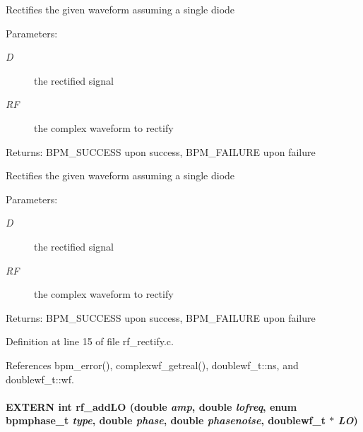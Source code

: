 Rectifies the given waveform assuming a single diode \begin{Desc}
\item[Parameters:]
\begin{description}
\item[{\em D}]the rectified signal \item[{\em RF}]the complex waveform to rectify \end{description}
\end{Desc}
\begin{Desc}
\item[Returns:]BPM\_\-SUCCESS upon success, BPM\_\-FAILURE upon failure\end{Desc}
Rectifies the given waveform assuming a single diode \begin{Desc}
\item[Parameters:]
\begin{description}
\item[{\em D}]the rectified signal \item[{\em RF}]the complex waveform to rectify \end{description}
\end{Desc}
\begin{Desc}
\item[Returns:]BPM\_\-SUCCESS upon success, BPM\_\-FAILURE upon failure \end{Desc}


Definition at line 15 of file rf\_\-rectify.c.

References bpm\_\-error(), complexwf\_\-getreal(), doublewf\_\-t::ns, and doublewf\_\-t::wf.
\paragraph[rf\_\-addLO]{\setlength{\rightskip}{0pt plus 5cm}EXTERN int rf\_\-addLO (double {\em amp}, \/  double {\em lofreq}, \/  enum {\bf bpmphase\_\-t} {\em type}, \/  double {\em phase}, \/  double {\em phasenoise}, \/  {\bf doublewf\_\-t} $\ast$ {\em LO})}\hfill\label{group__rf_g3d919b312272011b902c530eb36415c1}


